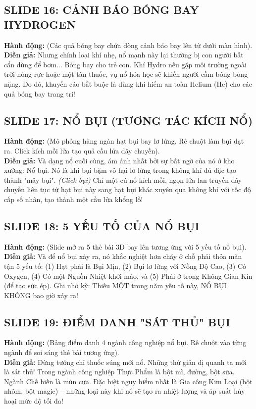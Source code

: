 \documentclass[13pt,a4paper]{article}
\begin{document}
\subsection*{SLIDE 16: CẢNH BÁO BÓNG BAY HYDROGEN}
\textbf{Hành động:} (Các quả bóng bay chứa dòng cảnh báo bay lên từ dưới màn hình).\\
\textbf{Diễn giả:} Nhưng chính loại khí nhẹ, nổ mạnh này lại thường bị con người bất cẩn dùng để bơm... Bóng bay cho trẻ con. Khí Hydro nếu gặp môi trường ngoài trời nóng rực hoặc một tàn thuốc, vụ nổ hóa học sẽ khiến người cầm bóng bỏng nặng. Do đó, khuyến cáo bắt buộc là dùng khí hiếm an toàn Helium (He) cho các quả bóng bay trang trí!

\subsection*{SLIDE 17: NỔ BỤI (TƯƠNG TÁC KÍCH NỔ)}
\textbf{Hành động:} (Mô phỏng hàng ngàn hạt bụi bay lơ lửng. Rê chuột làm bụi dạt ra. Click kích mồi lửa tạo quả cầu lửa dây chuyền).\\
\textbf{Diễn giả:} Và dạng nổ cuối cùng, ám ảnh nhất bởi sự bất ngờ của nó ở kho xưởng: Nổ bụi. Nó là khi bụi bặm vô hại lơ lửng trong không khí đủ đặc tạo thành "mây bụi". \textit{(Click bụi)} Chỉ một cú nổ kích mồi, ngọn lửa lan truyền dây chuyền liên tục từ hạt bụi này sang hạt bụi khác xuyên qua không khí với tốc độ cấp số nhân, tạo thành một cầu lửa khổng lồ!

\subsection*{SLIDE 18: 5 YẾU TỐ CỦA NỔ BỤI}
\textbf{Hành động:} (Slide mở ra 5 thẻ bài 3D bay lên tương ứng với 5 yếu tố nổ bụi).\\
\textbf{Diễn giả:} Và để nổ bụi xảy ra, nó khắc nghiệt hơn cháy ở chỗ phải thỏa mãn tận 5 yếu tố: (1) Hạt phải là Bụi Mịn, (2) Bụi lơ lửng với Nồng Độ Cao, (3) Có Oxygen, (4) Có một Nguồn Nhiệt khởi mào, và (5) Phải ở trong Không Gian Kín (để tạo sức ép). Ghi nhớ kỹ: Thiếu MỘT trong năm yếu tố này, NỔ BỤI KHÔNG bao giờ xảy ra!

\subsection*{SLIDE 19: ĐIỂM DANH "SÁT THỦ" BỤI}
\textbf{Hành động:} (Bảng điểm danh 4 ngành công nghiệp nổ bụi. Rê chuột vào từng ngành để soi sáng thẻ bài tương ứng).\\
\textbf{Diễn giả:} Đừng tưởng chỉ thuốc súng mới nổ. Những thứ giản dị quanh ta mới là sát thủ! Trong ngành công nghiệp Thực Phẩm là bột mì, đường, bột sữa. Ngành Chế biến là mùn cưa. Đặc biệt nguy hiểm nhất là Gia công Kim Loại (bột nhôm, bột magie) – những loại này khi nổ sẽ tạo ra nhiệt lượng và áp suất hủy hoại mức độ tối đa!
\end{document}
